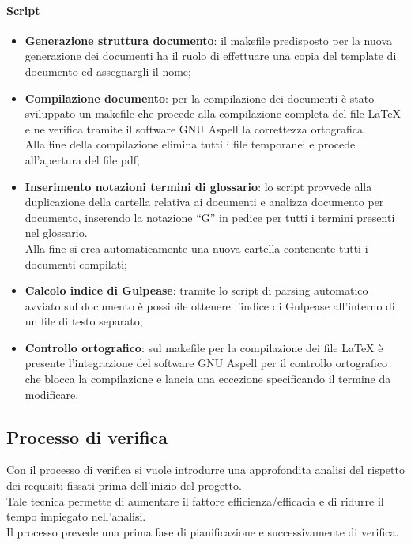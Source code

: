 			\paragraph{Script} %
			\label{par:script_doc}
				\begin{itemize}
					\item \textbf{Generazione struttura documento}: il makefile predisposto per la nuova generazione dei documenti ha il ruolo di effettuare una copia del template di documento ed assegnargli il nome;
					\item \textbf{Compilazione documento}: per la compilazione dei documenti è stato sviluppato un makefile che procede alla compilazione completa del file \LaTeX{} e ne verifica tramite il software GNU Aspell la correttezza ortografica.\\
					Alla fine della compilazione elimina tutti i file temporanei e procede all'apertura del file pdf;
					\item \textbf{Inserimento notazioni termini di glossario}: lo script provvede alla duplicazione della cartella relativa ai documenti e analizza documento per documento, inserendo la notazione  ``G'' in pedice per tutti i termini presenti nel glossario. \\
					Alla fine si crea automaticamente una nuova cartella contenente tutti i documenti compilati;
					\item \textbf{Calcolo indice di Gulpease}: tramite lo script di parsing automatico avviato sul documento è possibile ottenere l'indice di Gulpease all'interno di un file di testo separato;
					\item \textbf{Controllo ortografico}: sul makefile per la compilazione dei file \LaTeX{} è presente l'integrazione del software GNU Aspell per il controllo ortografico che blocca la compilazione e lancia una eccezione specificando il termine da modificare.
				\end{itemize}
			


	\subsection{Processo di verifica}
	Con il processo di verifica si vuole introdurre una approfondita analisi del rispetto dei requisiti fissati prima dell'inizio del progetto.\\
	Tale tecnica permette di aumentare il fattore efficienza/efficacia e di ridurre il tempo impiegato nell'analisi.\\
	Il processo prevede una prima fase di pianificazione e successivamente di verifica.

